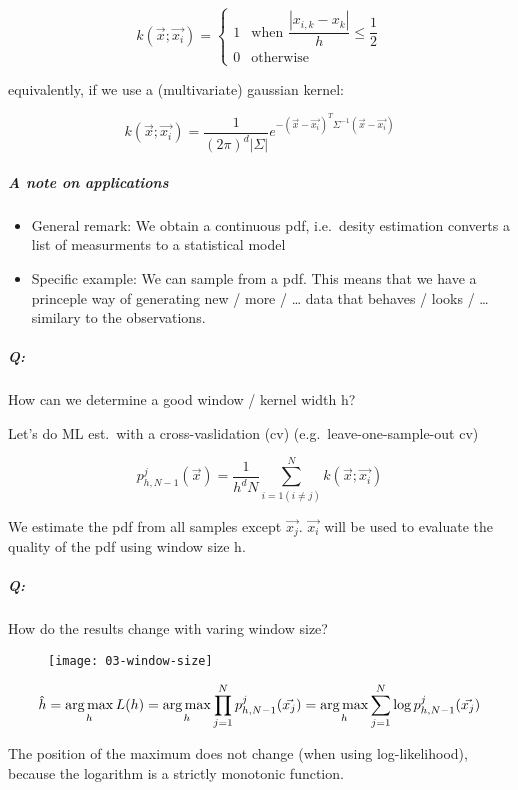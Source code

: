 \begin{equation*}
  k(\vec{x}; \vec{x_i}) = \begin{cases}
    1 &\text{when } \dfrac{|x_{i,k} - x_k|}{h} \le \dfrac{1}{2}\\
    0 &\text{otherwise}
  \end{cases}
\end{equation*}

equivalently, if we use a (multivariate) gaussian kernel:


\begin{equation*}
   k(\vec{x}; \vec{x_i}) = \dfrac{1}{{(2\pi)}^d |\Sigma|} e^{-{(\vec{x} - \vec{x_i})}^T \Sigma^{-1}(\vec{x}-\vec{x_i})}
\end{equation*}

\subparagraph{A note on applications}
\begin{itemize}
  \item General remark: We obtain a continuous pdf, i.e.\ desity estimation converts a list of measurments to a statistical model
  \item Specific example: We can sample from a pdf. This means that we have a princeple way of generating new / more / \ldots{} data that behaves / looks / \ldots{} similary to the observations.
\end{itemize}


\subparagraph{Q:} How can we determine a good window / kernel width h?

Let's do ML est.\ with a cross-vaslidation (cv) (e.g.\ leave-one-sample-out cv)

\begin{equation*}
  p_{h,N-1}^j(\vec{x}) = \dfrac{1}{h^d N} \sum_{i=1 (i \neq j)}^N k(\vec{x}; \vec{x_i})
\end{equation*}

We estimate the pdf from all samples except $\vec{x_j}$. $\vec{x_i}$ will be used to evaluate the quality of the pdf using window size h.

\subparagraph{Q:} How do the results change with varing window size?

\begin{figure}[H]
  \centering
  \texttt{[image: 03-window-size]}
\end{figure}

\begin{equation*}
\hat{h} = \operatorname*{arg\,max}_h L(h) = \operatorname*{arg\,max}_h \prod_{j=1}^N p_{h,N-1}^j(\vec{x_j}) = \operatorname*{arg\,max}_h \sum_{j=1}^N \log p_{h,N-1}^j(\vec{x_j})
\end{equation*}

The position of the maximum does not change (when using log-likelihood), because the logarithm is a strictly monotonic function.
